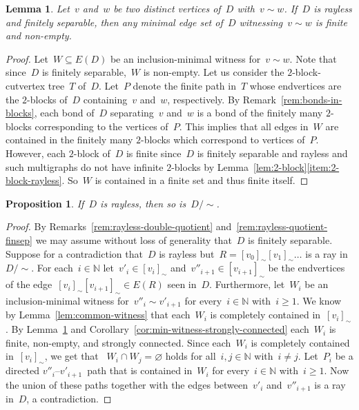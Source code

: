 \documentclass[reqno, 12pt]{amsart}
\numberwithin{equation}{section}
\numberwithin{figure}{section}
\let\emptyset=\varnothing
\theoremstyle{plain}
\newtheorem{lemma}[thm]{Lemma}
\newtheorem{proposition}[thm]{Proposition}
\theoremstyle{definition}
\begin{document}
\begin{lemma}
    \label{lem:rayless-finite}
    Let~$v$ and~$w$ be two distinct vertices of~$D$ with~${v \sim w}$. 
    If~$D$ is rayless and finitely separable,  
    then any minimal edge set of~$D$ witnessing~${v \sim w}$ is finite and non-empty. 
\end{lemma}



\begin{proof}
    Let~${W \subseteq E(D)}$ be an inclusion-minimal witness for~${v \sim w}$. 
    Note that since~$D$ is finitely separable,~$W$ is non-empty. 
    Let us consider the $2$-block-cutvertex tree~$T$ of~$D$. 
    Let~$P$ denote the finite path in~$T$ whose endvertices are the $2$-blocks of~$D$ containing~$v$ and~$w$, respectively. 
    By Remark~\ref{rem:bonds-in-blocks}, each bond of~$D$ separating~$v$ and~$w$ is a bond of the finitely many $2$-blocks corresponding to the vertices of~$P$.
    This implies that all edges in~$W$ are contained in the finitely many $2$-blocks which correspond to vertices of~$P$.
    However, each $2$-block of~$D$ is finite since~$D$ is finitely separable and rayless 
    and such multigraphs do not have infinite $2$-blocks by Lemma~\ref{lem:2-block}\ref{item:2-block-rayless}. 
    So~$W$ is contained in a finite set and thus finite itself. 
\end{proof}


\begin{proposition}
    \label{prop:rayless-quotient}
    If~$D$ is rayless, then so is~${D{/}{\sim}}$.
\end{proposition}

\begin{proof}
    By Remarks~\ref{rem:rayless-double-quotient} and~\ref{rem:rayless-quotient-finsep} we may assume without loss of generality that~$D$ is finitely separable. 
    Suppose for a contradiction that~$D$ is rayless but~${R = [v_0]_\sim[v_1]_\sim \ldots}$ is a ray in~${D{/}{\sim}}$. 
    For each~${i \in \mathbb{N}}$ let~${v'_i \in [v_i]_\sim}$ and~${v''_{i+1} \in [v_{i+1}]_\sim}$ be the endvertices of the edge~${[v_{i}]_\sim [v_{i+1}]_\sim \in E(R)}$ seen in~$D$.
    Furthermore, let~$W_i$ be an inclusion-minimal witness for~${v''_{i} \sim v'_{i+1}}$ for every~${i \in \mathbb{N}}$ with~${i \geq 1}$.
    We know by Lemma~\ref{lem:common-witness} that each~$W_i$ is completely contained in~$[v_i]_\sim$.
    By Lemma~\ref{lem:rayless-finite} and Corollary~\ref{cor:min-witness-strongly-connected} each~$W_i$ is finite, non-empty, and strongly connected. 
    Since each~$W_i$ is completely contained in~${[v_i]_\sim}$, we get that 
   ~${W_i \cap W_j = \emptyset}$ holds for all~${i, j \in \mathbb{N}}$ with~${i \neq j}$.
    Let~${P_i}$ be a directed $v''_{i}$--$v'_{i+1}$~path that is contained in~$W_i$ for every~${i \in \mathbb{N}}$ with~${i \geq 1}$. 
    Now the union of these paths together with the edges between~$v'_i$ and~$v''_{i+1}$ 
    is a ray in~$D$, a contradiction. 
\end{proof}
\end{document}
